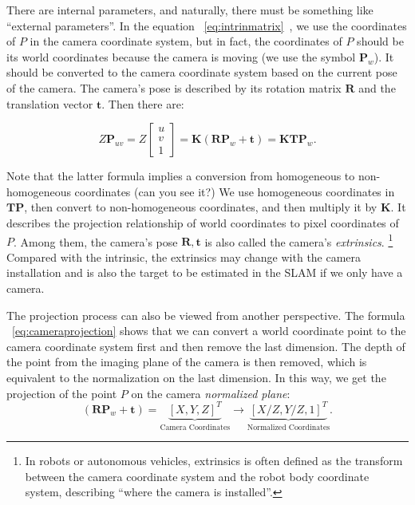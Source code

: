 There are internal parameters, and naturally, there must be something like ``external parameters''. In the equation ~\eqref{eq:intrinmatrix}~, we use the coordinates of $P$ in the camera coordinate system, but in fact, the coordinates of $P$ should be its world coordinates because the camera is moving (we use the symbol $\mathbf{P}_w$). It should be converted to the camera coordinate system based on the current pose of the camera. The camera's pose is described by its rotation matrix $\mathbf{R}$ and the translation vector $\mathbf{t}$. Then there are:

\begin{equation}
\label{eq:cameraprojection}
Z \mathbf{P}_{uv}=
Z \left[ \begin{array}{l}
u\\
v\\
1
\end{array} \right] = \mathbf{K} \left( {\mathbf{R}{ \mathbf{P}_w} + \mathbf{t}} \right) =  \mathbf{K} \mathbf{T} \mathbf{P}_w .
\end{equation}

Note that the latter formula implies a conversion from homogeneous to non-homogeneous coordinates (can you see it?) We use homogeneous coordinates in $\mathbf{T}\mathbf{P}$, then convert to non-homogeneous coordinates, and then multiply it by $\mathbf{K}$.  It describes the projection relationship of world coordinates to pixel coordinates of $P$. Among them, the camera's pose $\mathbf{R}, \mathbf{t}$ is also called the camera's \textit{extrinsics}. \footnote{In robots or autonomous vehicles, extrinsics is often defined as the transform between the camera coordinate system and the robot body coordinate system, describing ``where the camera is installed''.}  Compared with the intrinsic, the extrinsics may change with the camera installation and is also the target to be estimated in the SLAM if we only have a camera.

The projection process can also be viewed from another perspective. The formula ~\eqref{eq:cameraprojection} shows that we can convert a world coordinate point to the camera coordinate system first and then remove the last dimension. The depth of the point from the imaging plane of the camera is then removed, which is equivalent to the normalization on the last dimension. In this way, we get the projection of the point $P$ on the camera \textit{normalized plane}:
\begin{equation}
\left( {\mathbf{R}{\mathbf{P}_w} + \mathbf{t}} \right) = \underbrace{\left[ X,Y,Z\right]^T}_{\text{Camera Coordinates}} \to \underbrace {\left[ {X/Z,Y/Z,1} \right]^T}_{\text{Normalized Coordinates}}.
\end{equation}

